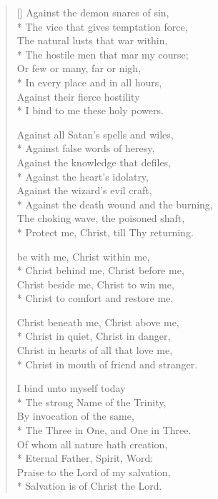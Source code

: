 \begin{verse}[\versewidth]
Against the demon snares of sin,\\*
The vice that gives temptation force,\\
The natural lusts that war within,\\*
The hostile men that mar my course;\\
Or few or many, far or nigh,\\*
In every place and in all hours,\\
Against their fierce hostility\\*
I bind to me these holy powers.

Against all Satan's spells and wiles,\\*
Against false words of heresy,\\
Against the knowledge that defiles,\\*
Against the heart's idolatry,\\
Against the wizard's evil craft,\\*
Against the death wound and the burning,\\
The choking wave, the poisoned shaft,\\*
Protect me, Christ, till Thy returning.



\newHymn

\vin {} be with me, Christ within me,\\*
\vin Christ behind me, Christ before me,\\
\vin Christ beside me, Christ to win me,\\*
\vin Christ to comfort and restore me.

\vin Christ beneath me, Christ above me,\\*
\vin Christ in quiet, Christ in danger,\\
\vin Christ in hearts of all that love me,\\*
\vin Christ in mouth of friend and stranger.



I bind unto myself today\\*
The strong Name of the Trinity,\\
By invocation of the same,\\*
The Three in One, and One in Three.\\
Of whom all nature hath creation,\\*
Eternal Father, Spirit, Word:\\
Praise to the Lord of my salvation,\\*
Salvation is of Christ the Lord.

\end{verse}



